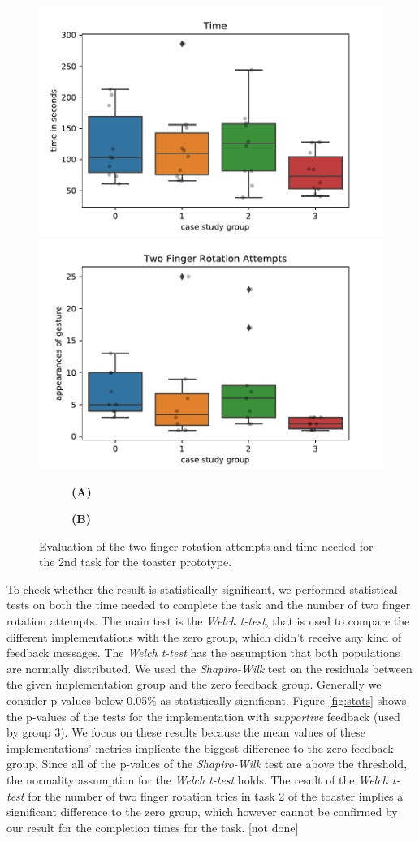 \documentclass[11pt, a4paper]{article}
\begin{document}
			\begin{figure}[H]
				\centering
				\includegraphics[width=.49\textwidth]{img/plot/plot_bplot_time.pdf}
				\includegraphics[width=.49\textwidth]{img/plot/plot_bplot_tfr.pdf}
				\begin{subfigure}[t]{.49\textwidth}\centering
					\textbf{(A)}
				\end{subfigure}
				\begin{subfigure}[t]{.49\textwidth}\centering
					\textbf{(B)}
				\end{subfigure}
				\caption{Evaluation of the two finger rotation attempts and time needed for the 2nd task for the toaster prototype.}
				\label{fig:t2_metrics}
			\end{figure}

			To check whether the result is statistically significant, we performed statistical tests on both the time needed to complete the task and the number of two finger rotation attempts. The main test is the \emph{Welch t-test}, that is used to compare the different implementations with the zero group, which didn't receive any kind of feedback messages. The \emph{Welch t-test} has the assumption that both populations are normally distributed. We used the \emph{Shapiro-Wilk} test on the residuals between the given implementation group and the zero feedback group. Generally we consider p-values below 0.05\% as statistically significant. Figure \ref{fig:stats} shows the p-values of the tests for the implementation with \emph{supportive} feedback (used by group 3). We focus on these results because the mean values of these implementations' metrics implicate the biggest difference to the zero feedback group. Since all of the p-values of the \emph{Shapiro-Wilk} test are above the threshold, the normality assumption for the \emph{Welch t-test} holds. The result of the \emph{Welch t-test} for the number of two finger rotation tries in task 2 of the toaster implies a significant difference to the zero group, which however cannot be confirmed by our result for the completion times for the task. [not done]
\end{document}
